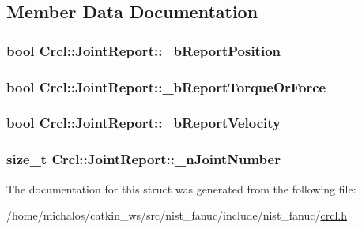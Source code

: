 \subsection{Member Data Documentation}
\hypertarget{structCrcl_1_1JointReport_a768a2ddefebd748006d8295f863a2faf}{
\subsubsection[{\-\_\-b\-Report\-Position}]{\setlength{\rightskip}{0pt plus 5cm}bool Crcl\-::\-Joint\-Report\-::\-\_\-b\-Report\-Position}}\label{structCrcl_1_1JointReport_a768a2ddefebd748006d8295f863a2faf}
\hypertarget{structCrcl_1_1JointReport_a8688287259bf8e0619a6f4a06a3c5721}{
\subsubsection[{\-\_\-b\-Report\-Torque\-Or\-Force}]{\setlength{\rightskip}{0pt plus 5cm}bool Crcl\-::\-Joint\-Report\-::\-\_\-b\-Report\-Torque\-Or\-Force}}\label{structCrcl_1_1JointReport_a8688287259bf8e0619a6f4a06a3c5721}
\hypertarget{structCrcl_1_1JointReport_aea4383b9bb5263ec07cc151d574442c9}{
\subsubsection[{\-\_\-b\-Report\-Velocity}]{\setlength{\rightskip}{0pt plus 5cm}bool Crcl\-::\-Joint\-Report\-::\-\_\-b\-Report\-Velocity}}\label{structCrcl_1_1JointReport_aea4383b9bb5263ec07cc151d574442c9}
\hypertarget{structCrcl_1_1JointReport_ac49defefe1565597177b1363dec3eb66}{
\subsubsection[{\-\_\-n\-Joint\-Number}]{\setlength{\rightskip}{0pt plus 5cm}size\-\_\-t Crcl\-::\-Joint\-Report\-::\-\_\-n\-Joint\-Number}}\label{structCrcl_1_1JointReport_ac49defefe1565597177b1363dec3eb66}


The documentation for this struct was generated from the following file\-:\begin{DoxyCompactItemize}
\item 
/home/michalos/catkin\-\_\-ws/src/nist\-\_\-fanuc/include/nist\-\_\-fanuc/\hyperlink{crcl_8h}{crcl.\-h}\end{DoxyCompactItemize}
